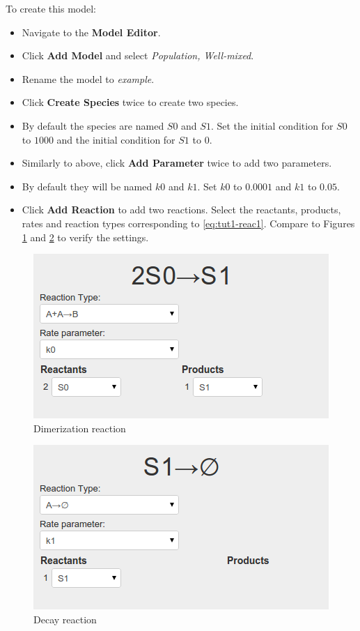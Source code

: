 To create this model:
\begin{itemize}
  \item Navigate to the \textbf{Model Editor}.
  \item Click \textbf{Add Model} and select \textit{Population, Well-mixed}.
  \item Rename the model to \textit{example}.
  \item Click \textbf{Create Species} twice to create two species.
  \item By default the species are named $S0$ and $S1$. Set the initial condition for $S0$ to $1000$ and the initial condition for $S1$ to $0$.
  \item Similarly to above, click \textbf{Add Parameter} twice to add two parameters.
  \item By default they will be named $k0$ and $k1$. Set $k0$ to $0.0001$ and $k1$ to $0.05$.
  \item Click \textbf{Add Reaction} to add two reactions. Select the reactants, products, rates and reaction types corresponding to \eqref{eq:tut1-reac1}. Compare to Figures \ref{fig:reaction2} and \ref{fig:reaction1} to verify the settings.
\end{itemize}

\begin{figure}[!htb]
\centering
\includegraphics[scale=0.64]{T1/reaction2.png}
\caption{Dimerization reaction}
\label{fig:reaction2}
\end{figure}

\begin{figure}[!htb]
\centering
\includegraphics[scale=0.64]{T1/reaction1.png}
\caption{Decay reaction}
\label{fig:reaction1}
\end{figure}

